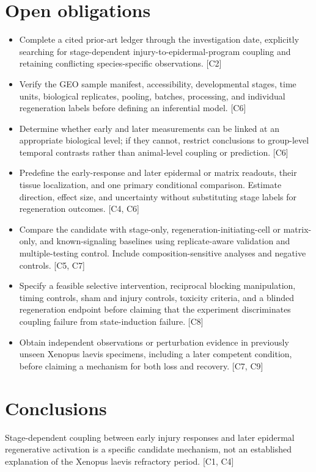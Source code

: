 \documentclass[11pt]{article}
\begin{document}
\section{Open obligations}
\begin{itemize}
\item Complete a cited prior-art ledger through the investigation date, explicitly searching for stage-dependent injury-to-epidermal-program coupling and retaining conflicting species-specific observations. [C2]
\item Verify the GEO sample manifest, accessibility, developmental stages, time units, biological replicates, pooling, batches, processing, and individual regeneration labels before defining an inferential model. [C6]
\item Determine whether early and later measurements can be linked at an appropriate biological level; if they cannot, restrict conclusions to group-level temporal contrasts rather than animal-level coupling or prediction. [C6]
\item Predefine the early-response and later epidermal or matrix readouts, their tissue localization, and one primary conditional comparison. Estimate direction, effect size, and uncertainty without substituting stage labels for regeneration outcomes. [C4, C6]
\item Compare the candidate with stage-only, regeneration-initiating-cell or matrix-only, and known-signaling baselines using replicate-aware validation and multiple-testing control. Include composition-sensitive analyses and negative controls. [C5, C7]
\item Specify a feasible selective intervention, reciprocal blocking manipulation, timing controls, sham and injury controls, toxicity criteria, and a blinded regeneration endpoint before claiming that the experiment discriminates coupling failure from state-induction failure. [C8]
\item Obtain independent observations or perturbation evidence in previously unseen Xenopus laevis specimens, including a later competent condition, before claiming a mechanism for both loss and recovery. [C7, C9]
\end{itemize}
\section{Conclusions}
Stage-dependent coupling between early injury responses and later epidermal regenerative activation is a specific candidate mechanism, not an established explanation of the Xenopus laevis refractory period. [C1, C4]
\end{document}
